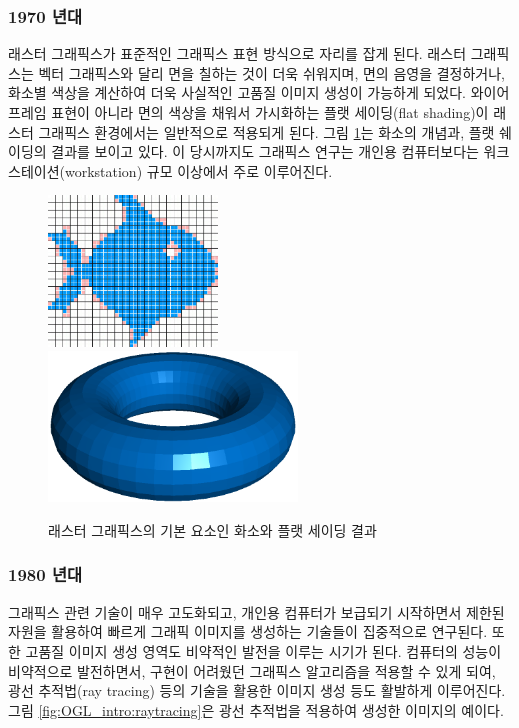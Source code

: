 \subsubsection{1970 년대}

래스터 그래픽스가 표준적인 그래픽스 표현 방식으로 자리를 잡게 된다.  래스터 그래픽스는 벡터 그래픽스와 달리 면을 칠하는 것이 더욱 쉬워지며, 면의 음영을 결정하거나, 화소별 색상을 계산하여 더욱 사실적인 고품질 이미지 생성이 가능하게 되었다. 와이어 프레임 표현이 아니라 면의 색상을 채워서 가시화하는 플랫 세이딩(flat shading)이 래스터 그래픽스 환경에서는 일반적으로 적용되게 된다. 그림 \ref{fig:OGL_intro:rastergraphics}는 화소의 개념과, 플랫 쉐이딩의 결과를 보이고 있다. 이 당시까지도 그래픽스 연구는 개인용 컴퓨터보다는 워크스테이션(workstation) 규모 이상에서 주로 이루어진다.

\begin{figure}[h!]
  \centering
    \includegraphics[height=4cm]{OGL_intro/rasterFish.jpg}
    \includegraphics[height=4cm]{OGL_intro/flatShading.png}
    \caption{래스터 그래픽스의 기본 요소인 화소와 플랫 세이딩 결과}
    \label{fig:OGL_intro:rastergraphics}
\end{figure}

\subsubsection{1980 년대}

그래픽스 관련 기술이 매우 고도화되고, 개인용 컴퓨터가 보급되기 시작하면서 제한된 자원을 활용하여 빠르게 그래픽 이미지를 생성하는 기술들이 집중적으로 연구된다. 또한 고품질 이미지 생성 영역도 비약적인 발전을 이루는 시기가 된다. 컴퓨터의 성능이 비약적으로 발전하면서, 구현이 어려웠던 그래픽스 알고리즘을 적용할 수 있게 되여, 광선 추적법(ray tracing) 등의 기술을 활용한 이미지 생성 등도 활발하게 이루어진다. 그림 \ref{fig:OGL_intro:raytracing}은 광선 추적법을 적용하여 생성한 이미지의 예이다.

